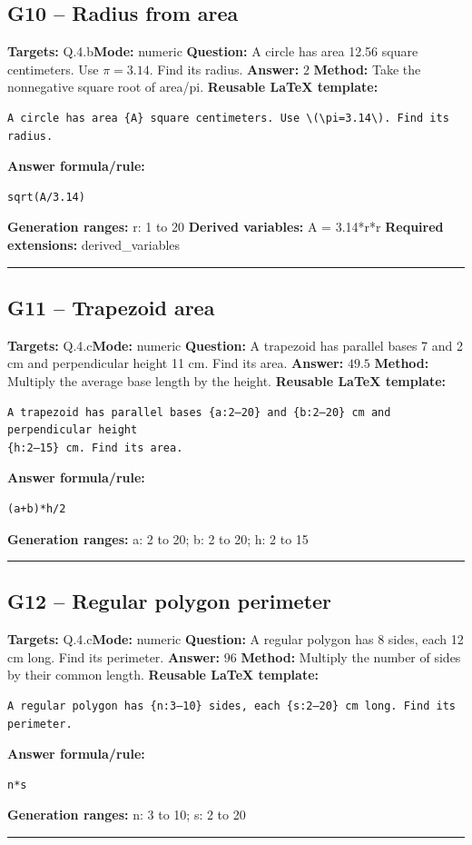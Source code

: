 \documentclass[11pt]{article}
\begin{document}
\subsection{G10 -- Radius from area}
\textbf{Targets:} Q.4.b\quad\textbf{Mode:} numeric
\textbf{Question:} A circle has area 12.56 square centimeters. Use \(\pi=3.14\). Find its radius.
\textbf{Answer:} \(2\)
\textbf{Method:} Take the nonnegative square root of area/pi.
\textbf{Reusable LaTeX template:}
\begin{verbatim}
A circle has area {A} square centimeters. Use \(\pi=3.14\). Find its radius.
\end{verbatim}
\textbf{Answer formula/rule:}
\begin{verbatim}
sqrt(A/3.14)
\end{verbatim}
\textbf{Generation ranges:} r: 1 to 20
\textbf{Derived variables:} A = 3.14*r*r
\textbf{Required extensions:} derived\_variables
\medskip\hrule\medskip
\subsection{G11 -- Trapezoid area}
\textbf{Targets:} Q.4.c\quad\textbf{Mode:} numeric
\textbf{Question:} A trapezoid has parallel bases 7 and 2 cm and perpendicular height 11 cm. Find its area.
\textbf{Answer:} \(49.5\)
\textbf{Method:} Multiply the average base length by the height.
\textbf{Reusable LaTeX template:}
\begin{verbatim}
A trapezoid has parallel bases {a:2–20} and {b:2–20} cm and perpendicular height
{h:2–15} cm. Find its area.
\end{verbatim}
\textbf{Answer formula/rule:}
\begin{verbatim}
(a+b)*h/2
\end{verbatim}
\textbf{Generation ranges:} a: 2 to 20; b: 2 to 20; h: 2 to 15
\medskip\hrule\medskip
\subsection{G12 -- Regular polygon perimeter}
\textbf{Targets:} Q.4.c\quad\textbf{Mode:} numeric
\textbf{Question:} A regular polygon has 8 sides, each 12 cm long. Find its perimeter.
\textbf{Answer:} \(96\)
\textbf{Method:} Multiply the number of sides by their common length.
\textbf{Reusable LaTeX template:}
\begin{verbatim}
A regular polygon has {n:3–10} sides, each {s:2–20} cm long. Find its perimeter.
\end{verbatim}
\textbf{Answer formula/rule:}
\begin{verbatim}
n*s
\end{verbatim}
\textbf{Generation ranges:} n: 3 to 10; s: 2 to 20
\medskip\hrule\medskip
\end{document}
